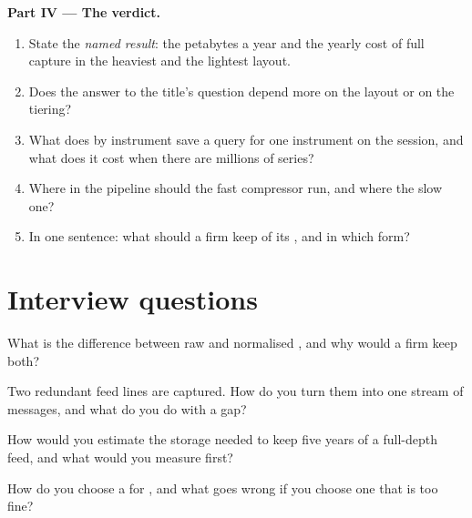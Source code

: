\begin{problem}
\medskip\noindent\textbf{Part IV --- The verdict.}
\begin{enumerate}[resume]
\item State the \emph{named result}: the petabytes a year and the yearly cost of full capture in the heaviest and the lightest
layout.
\item Does the answer to the title's question depend more on the layout or on the tiering?
\item What does  by instrument save a query for one instrument on the session, and what does it cost when there
are millions of series?
\item Where in the pipeline should the fast compressor run, and where the slow one?
\item In one sentence: what should a firm keep of its , and in which form?
\end{enumerate}
\end{problem}

\section{Interview questions}

\begin{interviewq}\label{iq:pl:capturing-and-storing-tick-data:1}
What is the difference between raw and normalised , and why would a firm keep both?
\end{interviewq}

\begin{interviewq}\label{iq:pl:capturing-and-storing-tick-data:2}
Two redundant feed lines are captured. How do you turn them into one stream of messages, and what do you do with a gap?
\end{interviewq}

\begin{interviewq}\label{iq:pl:capturing-and-storing-tick-data:3}
How would you estimate the storage needed to keep five years of a full-depth feed, and what would you measure first?
\end{interviewq}

\begin{interviewq}\label{iq:pl:capturing-and-storing-tick-data:4}
How do you choose a  for , and what goes wrong if you choose one that is too fine?
\end{interviewq}

